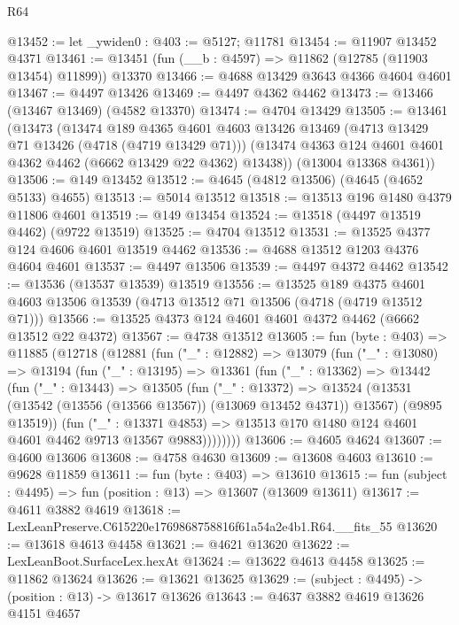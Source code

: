 \begin{lexlean}{R64}
\begin{coremodule}
@13452 := let _ywiden0 : @403 := @5127; @11781
@13454 := @11907 @13452 @4371
@13461 := @13451 (fun (__b : @4597) => @11862 (@12785 (@11903 @13454) @11899)) @13370
@13466 := @4688 @13429 @3643 @4366 @4604 @4601
@13467 := @4497 @13426
@13469 := @4497 @4362 @4462
@13473 := @13466 (@13467 @13469) (@4582 @13370)
@13474 := @4704 @13429
@13505 := @13461
    (@13473
      (@13474
        @189
        @4365
        @4601
        @4603
        @13426
        @13469
        (@4713 @13429 @71 @13426 (@4718 (@4719 @13429 @71)))
        (@13474 @4363 @124 @4601 @4601 @4362 @4462 (@6662 @13429 @22 @4362) @13438))
      (@13004 @13368 @4361))
@13506 := @149 @13452
@13512 := @4645 (@4812 @13506) (@4645 (@4652 @5133) @4655)
@13513 := @5014 @13512
@13518 := @13513 @196 @1480 @4379 @11806 @4601
@13519 := @149 @13454
@13524 := @13518 (@4497 @13519 @4462) (@9722 @13519)
@13525 := @4704 @13512
@13531 := @13525 @4377 @124 @4606 @4601 @13519 @4462
@13536 := @4688 @13512 @1203 @4376 @4604 @4601
@13537 := @4497 @13506
@13539 := @4497 @4372 @4462
@13542 := @13536 (@13537 @13539) @13519
@13556 := @13525
    @189
    @4375
    @4601
    @4603
    @13506
    @13539
    (@4713 @13512 @71 @13506 (@4718 (@4719 @13512 @71)))
@13566 := @13525 @4373 @124 @4601 @4601 @4372 @4462 (@6662 @13512 @22 @4372)
@13567 := @4738 @13512
@13605 := fun (byte : @403) =>
  @11885
    (@12718
      (@12881
        (fun ("_" : @12882) =>
        @13079
          (fun ("_" : @13080) =>
          @13194
            (fun ("_" : @13195) =>
            @13361
              (fun ("_" : @13362) =>
              @13442
                (fun ("_" : @13443) =>
                @13505
                  (fun ("_" : @13372) =>
                  @13524
                    (@13531 (@13542 (@13556 (@13566 @13567)) (@13069 @13452 @4371)) @13567)
                    (@9895 @13519))
                  (fun ("_" : @13371 @4853) =>
                  @13513 @170 @1480 @124 @4601 @4601 @4462 @9713 @13567 @9883))))))))
@13606 := @4605 @4624
@13607 := @4600 @13606
@13608 := @4758 @4630
@13609 := @13608 @4603
@13610 := @9628 @11859
@13611 := fun (byte : @403) => @13610
@13615 := fun (subject : @4495) => fun (position : @13) => @13607 (@13609 @13611)
@13617 := @4611 @3882 @4619
@13618 := LexLeanPreserve.C615220e1769868758816f61a54a2e4b1.R64.__fits_55
@13620 := @13618 @4613 @4458
@13621 := @4621 @13620
@13622 := LexLeanBoot.SurfaceLex.hexAt
@13624 := @13622 @4613 @4458
@13625 := @11862 @13624
@13626 := @13621 @13625
@13629 := (subject : @4495) -> (position : @13) -> @13617 @13626
@13643 := @4637
    @3882
    @4619
    @13626
    @4151
    @4657

\end{coremodule}
\end{lexlean}
